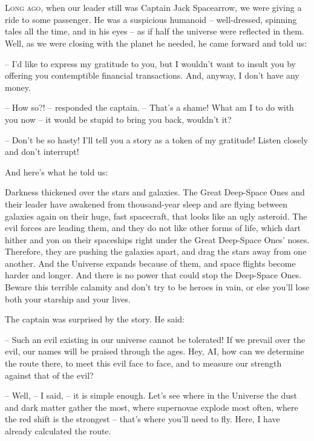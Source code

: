 \documentclass[ebook,twoside,final,openright]{memoir}
\begin{document}
\chapter{}
\par
\lettrine{L}{ong ago,} when our leader still was Captain Jack Spacearrow, we were giving a ride to some passenger. He was a suspicious humanoid – well-dressed, spinning tales all the time, and in his eyes – as if half the universe were reflected in them. Well, as we were closing with the planet he needed, he came forward and told us: \par
\par
– I'd like to express my gratitude to you, but I wouldn’t want to insult you by offering you contemptible financial transactions. And, anyway, I don’t have any money.\par
– How so?! – responded the captain. – That's a shame! What am I to do with you now – it would be stupid to bring you back, wouldn’t it? \par
– Don’t be so hasty! I'll tell you a story as a token of my gratitude! Listen closely and don’t interrupt! \par
 And here’s what he told us:\par
\par
Darkness thickened over the stars and galaxies. The Great Deep-Space Ones and their leader have awakened from thousand-year sleep and are flying between galaxies again on their huge, fast spacecraft, that looks like an ugly asteroid. The evil forces are leading them, and they do not like other forms of life, which dart hither and yon on their spaceships right under the Great Deep-Space Ones’ noses. Therefore, they are pushing the galaxies apart, and drag the stars away from one another. And the Universe expands because of them, and space flights become harder and longer. And there is no power that could stop the Deep-Space Ones. Beware this terrible calamity and don’t try to be heroes in vain, or else you’ll lose both your starship and your lives.\par
\par
The captain was surprised by the story. He said:\par
– Such an evil existing in our universe cannot be tolerated! If we prevail over the evil, our names will be praised through the ages. Hey, AI, how can we determine the route there, to meet this evil face to face, and to measure our strength against that of the evil?\par
– Well, – I said, – it is simple enough. Let's see where in the Universe the dust and dark matter gather the most, where supernovae explode most often, where the red shift is the strongest – that’s where you’ll need to fly. Here, I have already calculated the route.\par
\end{document}
